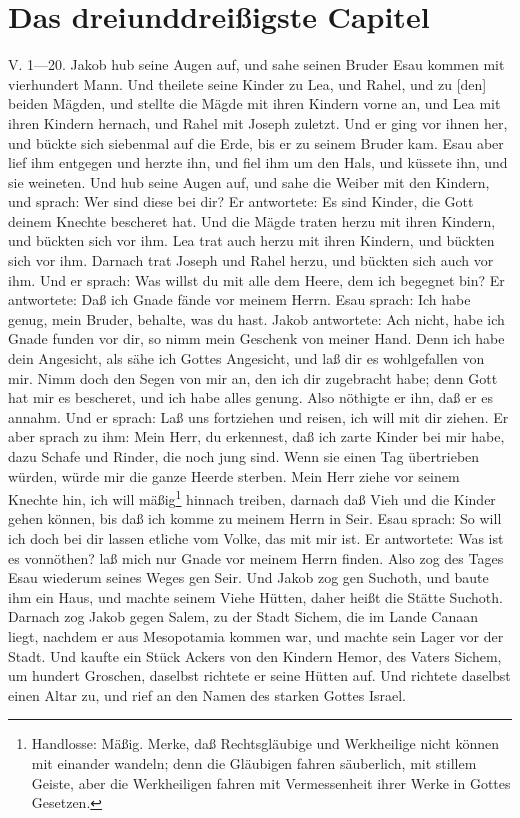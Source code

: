 \section{Das dreiunddreißigste Capitel}
V. 1—20. Jakob hub seine Augen auf, und sahe seinen Bruder Esau kommen mit vierhundert Mann. Und theilete seine Kinder zu Lea, und Rahel, und zu [den] beiden Mägden, und stellte die Mägde mit ihren Kindern vorne an, und Lea mit ihren Kindern hernach, und Rahel mit Joseph zuletzt. Und er ging vor ihnen her, und bückte sich siebenmal auf die Erde, bis er zu seinem Bruder kam. Esau aber lief ihm entgegen und herzte ihn, und fiel ihm um den Hals, und küssete ihn, und sie weineten. Und hub seine Augen auf, und sahe die Weiber mit den Kindern, und sprach: Wer sind diese bei dir? Er antwortete: Es sind Kinder, die Gott deinem Knechte bescheret hat. Und die Mägde traten herzu mit ihren Kindern, und bückten sich vor ihm. Lea trat auch herzu mit ihren Kindern, und bückten sich vor ihm. Darnach trat Joseph und Rahel herzu, und bückten sich auch vor ihm. Und er sprach: Was willst du mit alle dem Heere, dem ich begegnet bin? Er antwortete: Daß ich Gnade fände vor meinem Herrn. Esau sprach: Ich habe genug, mein Bruder, behalte, was du hast. Jakob antwortete: Ach nicht, habe ich Gnade funden vor dir, so nimm mein Geschenk von meiner Hand. Denn ich habe dein Angesicht, als sähe ich Gottes Angesicht, und laß dir es wohlgefallen von mir. Nimm doch den Segen von mir an, den ich dir zugebracht habe; denn Gott hat mir es bescheret, und ich habe alles genung. Also nöthigte er ihn, daß er es annahm. Und er sprach: Laß uns fortziehen und reisen, ich will mit dir ziehen. Er aber sprach zu ihm: Mein Herr, du erkennest, daß ich zarte Kinder bei mir habe, dazu Schafe und Rinder, die noch jung sind. Wenn sie einen Tag übertrieben würden, würde mir die ganze Heerde sterben. Mein Herr ziehe vor seinem Knechte hin, ich will mäßig\footnote{Handlosse: Mäßig. Merke, daß Rechtsgläubige und Werkheilige nicht können mit einander wandeln; denn die Gläubigen fahren säuberlich, mit stillem Geiste, aber die Werkheiligen fahren mit Vermessenheit ihrer Werke in Gottes Gesetzen.} hinnach treiben, darnach daß Vieh und die Kinder gehen können, bis daß ich komme zu meinem Herrn in Seir. Esau sprach: So will ich doch bei dir lassen etliche vom Volke,
das mit mir ist. Er antwortete: Was ist es vonnöthen? laß mich nur Gnade vor meinem Herrn finden. Also zog des Tages Esau wiederum seines Weges gen Seir. Und Jakob zog gen Suchoth, und baute ihm ein Haus, und machte seinem Viehe Hütten, daher heißt die Stätte Suchoth. Darnach zog Jakob gegen Salem, zu der Stadt Sichem, die im Lande Canaan liegt, nachdem er aus Mesopotamia kommen war, und machte sein Lager vor der Stadt. Und kaufte ein Stück Ackers von den Kindern Hemor, des Vaters Sichem, um hundert Groschen, daselbst richtete er seine Hütten auf. Und richtete daselbst einen Altar zu, und rief an den Namen des starken Gottes Israel.

